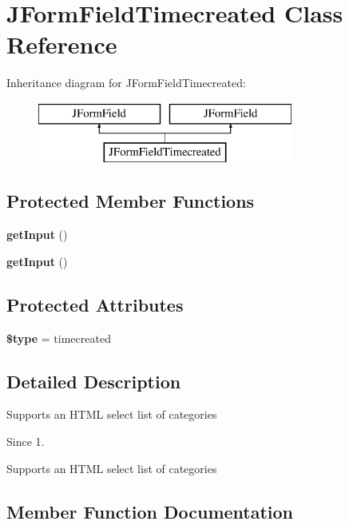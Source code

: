 \section{J\+Form\+Field\+Timecreated Class Reference}
\label{class_j_form_field_timecreated}
Inheritance diagram for J\+Form\+Field\+Timecreated\+:\begin{figure}[H]
\begin{center}
\leavevmode
\includegraphics[height=2.000000cm]{class_j_form_field_timecreated}
\end{center}
\end{figure}
\subsection*{Protected Member Functions}
\begin{DoxyCompactItemize}
\item 
\textbf{ get\+Input} ()
\item 
\textbf{ get\+Input} ()
\end{DoxyCompactItemize}
\subsection*{Protected Attributes}
\begin{DoxyCompactItemize}
\item 
\textbf{ \$type} = \textquotesingle{}timecreated\textquotesingle{}
\end{DoxyCompactItemize}


\subsection{Detailed Description}
Supports an H\+T\+ML select list of categories

\begin{DoxySince}{Since}
1.
\end{DoxySince}
Supports an H\+T\+ML select list of categories 

\subsection{Member Function Documentation}
\mbox{\label{class_j_form_field_timecreated_a4380f30ae9202fa49ebd2439572f9cdb}} 
